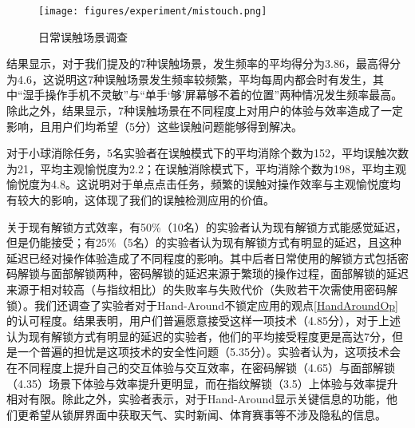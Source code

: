 \begin{figure}[h]
  \centering
  \texttt{[image: figures/experiment/mistouch.png]}
  \caption{日常误触场景调查}
  \label{fig:mistouch}
\end{figure}

结果显示，对于我们提及的7种误触场景，发生频率的平均得分为3.86，最高得分为4.6，这说明这7种误触场景发生频率较频繁，平均每周内都会时有发生，其中“湿手操作手机不灵敏”与“单手‘够’屏幕够不着的位置”两种情况发生频率最高。除此之外，结果显示，7种误触场景在不同程度上对用户的体验与效率造成了一定影响，且用户们均希望（5分）这些误触问题能够得到解决。

对于小球消除任务，5名实验者在误触模式下的平均消除个数为152，平均误触次数为21，平均主观愉悦度为2.2；在误触消除模式下，平均消除个数为198，平均主观愉悦度为4.8。这说明对于单点点击任务，频繁的误触对操作效率与主观愉悦度均有较大的影响，这体现了我们的误触检测应用的价值。

关于现有解锁方式效率，有50\%（10名）的实验者认为现有解锁方式能感觉延迟，但是仍能接受；有25\%（5名）的实验者认为现有解锁方式有明显的延迟，且这种延迟已经对操作体验造成了不同程度的影响。其中后者日常使用的解锁方式包括密码解锁与面部解锁两种，密码解锁的延迟来源于繁琐的操作过程，面部解锁的延迟来源于相对较高（与指纹相比）的失败率与失败代价（失败若干次需使用密码解锁）。我们还调查了实验者对于Hand-Around不锁定应用的观点\ref{HandAroundOp}的认可程度。结果表明，用户们普遍愿意接受这样一项技术（4.85分），对于上述认为现有解锁方式有明显的延迟的实验者，他们的平均接受程度更是高达7分，但是一个普遍的担忧是这项技术的安全性问题（5.35分）。实验者认为，这项技术会在不同程度上提升自己的交互体验与交互效率，在密码解锁（4.65）与面部解锁（4.35）场景下体验与效率提升更明显，而在指纹解锁（3.5）上体验与效率提升相对有限。除此之外，实验者表示，对于Hand-Around显示关键信息的功能，他们更希望从锁屏界面中获取天气、实时新闻、体育赛事等不涉及隐私的信息。